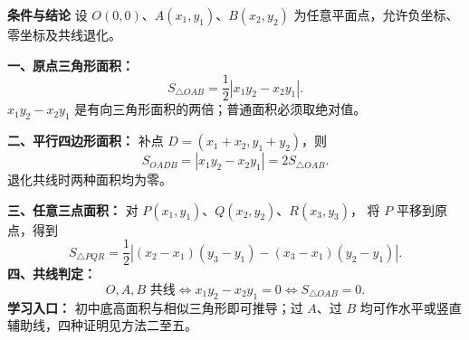 \begin{statementbox}

\textbf{\textcolor{CStatement}{条件与结论}}
设 $O(0,0)$、$A(x_1,y_1)$、$B(x_2,y_2)$ 为任意平面点，允许负坐标、零坐标及共线退化。

\textbf{一、原点三角形面积：}
\[
\boxed{S_{\triangle OAB}=\frac12|x_1y_2-x_2y_1|.}
\]
$x_1y_2-x_2y_1$ 是有向三角形面积的两倍；普通面积必须取绝对值。

\textbf{二、平行四边形面积：} 补点 $D=(x_1+x_2,y_1+y_2)$，则
\[
\boxed{S_{OADB}=|x_1y_2-x_2y_1|=2S_{\triangle OAB}.}
\]
退化共线时两种面积均为零。

\textbf{三、任意三点面积：} 对 $P(x_1,y_1)$、$Q(x_2,y_2)$、$R(x_3,y_3)$，
将 $P$ 平移到原点，得到
\[
\boxed{S_{\triangle PQR}=\frac12\left|
(x_2-x_1)(y_3-y_1)-(x_3-x_1)(y_2-y_1)\right|.}
\]
\textbf{四、共线判定：}
\[
O,A,B\text{ 共线}\iff x_1y_2-x_2y_1=0\iff S_{\triangle OAB}=0.
\]
\textbf{学习入口：} 初中底高面积与相似三角形即可推导；过 $A$、过 $B$ 均可作水平或竖直辅助线，四种证明见方法二至五。
\end{statementbox}
